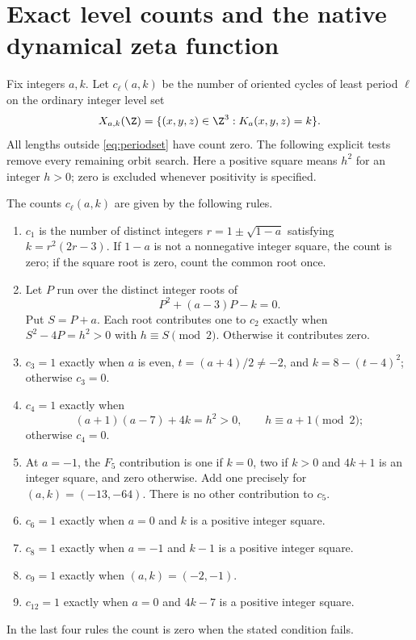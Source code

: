 \section{Exact level counts and the native dynamical zeta function}
\label{sec:counts}

Fix integers $a,k$. Let $c_\ell(a,k)$ be the number of
oriented cycles of least period $\ell$ on the ordinary integer
level set
\[
 X_{a,k}(\Z)=\{(x,y,z)\in\Z^3:K_a(x,y,z)=k\}.
\]
All lengths outside \eqref{eq:periodset} have count zero.
The following explicit tests remove every remaining orbit search.
Here a positive square means $h^2$ for an integer $h>0$;
zero is excluded whenever positivity is specified.

\begin{proposition}
\label{prop:counts}
The counts $c_\ell(a,k)$ are given by the following rules.
\begin{enumerate}
\item $c_1$ is the number of distinct integers
$r=1\pm\sqrt{1-a}$ satisfying $k=r^2(2r-3)$.
If $1-a$ is not a nonnegative integer square, the count is
zero; if the square root is zero, count the common root once.
\item Let $P$ run over the distinct integer roots of
\begin{equation}
 P^2+(a-3)P-k=0.
 \label{eq:period2quadratic}
\end{equation}
Put $S=P+a$. Each root contributes one to $c_2$ exactly
when $S^2-4P=h^2>0$ with $h\equiv S\pmod2$.
Otherwise it contributes zero.
\item $c_3=1$ exactly when $a$ is even,
$t=(a+4)/2\ne-2$, and $k=8-(t-4)^2$; otherwise $c_3=0$.
\item $c_4=1$ exactly when
\begin{equation}
 (a+1)(a-7)+4k=h^2>0,\qquad h\equiv a+1\pmod2;
 \label{eq:period4square}
\end{equation}
otherwise $c_4=0$.
\item At $a=-1$, the $F_5$ contribution is one if $k=0$,
two if $k>0$ and $4k+1$ is an integer square, and zero
otherwise. Add one precisely for $(a,k)=(-13,-64)$.
There is no other contribution to $c_5$.
\item $c_6=1$ exactly when $a=0$ and $k$ is a positive
integer square.
\item $c_8=1$ exactly when $a=-1$ and $k-1$ is a
positive integer square.
\item $c_9=1$ exactly when $(a,k)=(-2,-1)$.
\item $c_{12}=1$ exactly when $a=0$ and $4k-7$ is a
positive integer square.
\end{enumerate}
In the last four rules the count is zero when the stated
condition fails.
\end{proposition}

